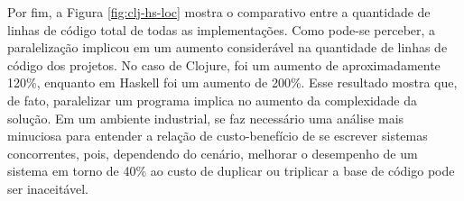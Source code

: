 Por fim, a Figura \ref{fig:clj-hs-loc} mostra o comparativo entre a quantidade de linhas de código total de todas as implementações. Como pode-se perceber, a paralelização implicou em um aumento considerável na quantidade de linhas de código dos projetos. No caso de Clojure, foi um aumento de aproximadamente 120\%, enquanto em Haskell foi um aumento de 200\%. Esse resultado mostra que, de fato, paralelizar um programa implica no aumento da complexidade da solução. Em um ambiente industrial, se faz necessário uma análise mais minuciosa para entender a relação de custo-benefício de se escrever sistemas concorrentes, pois, dependendo do cenário, melhorar o desempenho de um sistema em torno de 40\% ao custo de duplicar ou triplicar a base de código pode ser inaceitável.